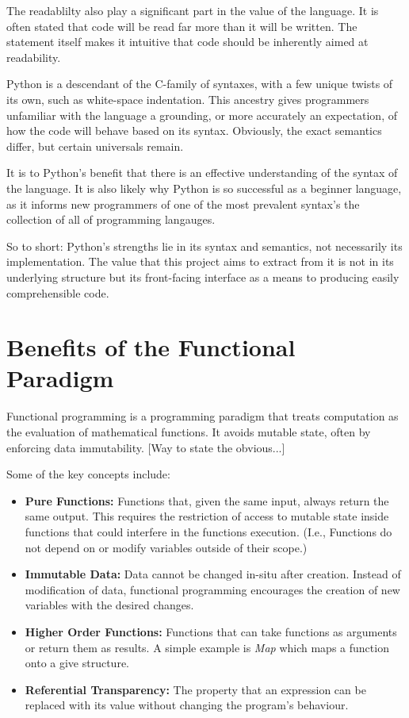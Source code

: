 \documentclass{l4proj}
\begin{document}
The readablilty also play a significant part in the value of the language.
It is often stated that code will be read far more than it will be written.
The statement itself makes it intuitive that code should be inherently aimed at readability.

Python is a descendant of the C-family of syntaxes, with a few unique twists of its own, such as white-space indentation.
This ancestry gives programmers unfamiliar with the language a grounding, or more accurately an expectation, of how the code will behave based on its syntax.
Obviously, the exact semantics differ, but certain universals remain.

It is to Python's benefit that there is an effective understanding of the syntax of the language.
It is also likely why Python is so successful as a beginner language, as it informs new programmers of one of the most prevalent syntax's the collection of all of programming langauges.

So to short: Python's strengths lie in its syntax and semantics, not necessarily its implementation.
The value that this project aims to extract from it is not in its underlying structure but its front-facing interface as a means to producing easily comprehensible code.

\section{Benefits of the Functional Paradigm}

Functional programming is a programming paradigm that treats computation as the evaluation of mathematical functions.
It avoids mutable state, often by enforcing data immutability.
[Way to state the obvious...]

Some of the key concepts include:

\begin{itemize}
    \item \textbf{Pure Functions:} Functions that, given the same input, always return the same output.
    This requires the restriction of access to mutable state inside functions that could interfere in the functions execution.
    (I.e., Functions do not depend on or modify variables outside of their scope.)
    \item \textbf{Immutable Data:} Data cannot be changed in-situ after creation.
    Instead of modification of data, functional programming encourages the creation of new variables with the desired changes.
    \item \textbf{Higher Order Functions:} Functions that can take functions as arguments or return them as results.
    A simple example is \emph{Map} which maps a function onto a give structure.
    \item \textbf{Referential Transparency:} The property that an expression can be replaced with its value without changing the program's behaviour. 
\end{itemize}
\end{document}
